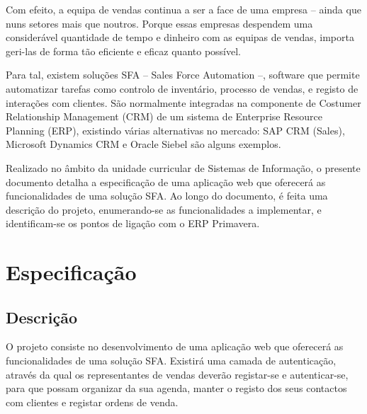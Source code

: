 \begin{titlepage}
Com efeito, a equipa de vendas continua a ser a face de uma empresa – ainda que nuns setores mais que noutros. Porque essas empresas despendem uma considerável quantidade de tempo e dinheiro com as equipas de vendas, importa geri-las de forma tão eficiente e eficaz quanto possível. 

Para tal, existem soluções SFA – Sales Force Automation –, software que permite automatizar tarefas como controlo de inventário, processo de vendas, e registo de interações com clientes. São normalmente integradas na componente de Costumer Relationship Management (CRM) de um sistema de Enterprise Resource Planning (ERP), existindo várias alternativas no mercado: SAP CRM (Sales), Microsoft Dynamics CRM e Oracle Siebel são alguns exemplos. 

Realizado no âmbito da unidade curricular de Sistemas de Informação, o presente documento detalha a especificação de uma aplicação web que oferecerá as funcionalidades de uma solução SFA. Ao longo do documento, é feita uma descrição do projeto, enumerando-se as funcionalidades a implementar, e identificam-se os pontos de ligação com o ERP Primavera. 


\newpage %


\section{Especificação}

\subsection{Descrição}
\justify\normalsize

O projeto consiste no desenvolvimento de uma aplicação web que oferecerá as funcionalidades de uma solução SFA. Existirá uma camada de autenticação, através da qual os representantes de vendas deverão registar-se e autenticar-se, para que possam organizar da sua agenda, manter o registo dos seus contactos com clientes e registar ordens de venda.
 

\end{titlepage}
